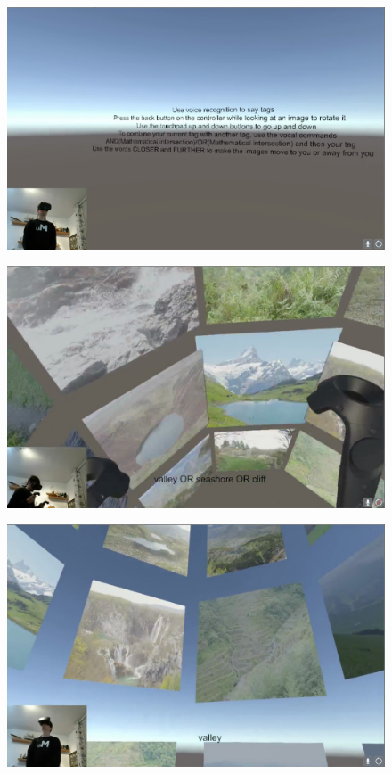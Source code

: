 \documentclass[11pt,a4paper]{article}
\begin{document}
\begin{figure}[h]
  \label{fig:help}
  \includegraphics[width=\textwidth]{img/Help.jpg}
\end{figure}

\begin{figure}[h]
  \label{fig:cntr}
  \includegraphics[width=\textwidth]{img/Controllers.jpg}
\end{figure}

\begin{figure}[h]
  \label{fig:1tag}
  \includegraphics[width=\textwidth]{img/SimpleTag.jpg}
\end{figure}
\end{document}
